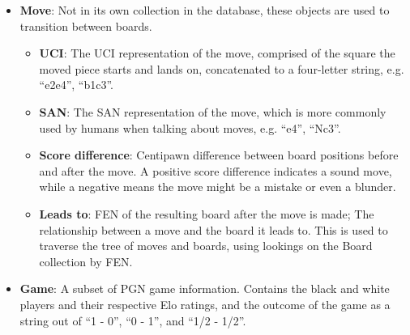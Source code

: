 \documentclass[architecture.tex]{subfiles}
\begin{document}
\begin{itemize}
\begin{itemize}
        \end{itemize}
    \item \textbf{Move}: Not in its own collection in the database, these
        objects are used to transition between boards.
        \begin{itemize}
            \item \textbf{UCI}: The UCI representation of the move, 
                comprised of the square the moved piece starts and lands on,
                concatenated to a four-letter string, e.g. ``e2e4'', ``b1c3''.
            \item \textbf{SAN}: The SAN representation of the move, which
                is more commonly used by humans when talking about moves,
                e.g. ``e4'', ``Nc3''. 
            \item \textbf{Score difference}:
                Centipawn difference between board positions before and after the move.
                A positive score difference indicates a sound move, while a negative
                means the move might be a mistake or even a blunder.
            \item \textbf{Leads to}: FEN of the resulting board after the move is made;
                The relationship between a move and the board it leads to.
                This is used to traverse the tree of moves and boards,
                using lookings on the Board collection by FEN.
        \end{itemize}
    \item \textbf{Game}: A subset of PGN game information. Contains the black
        and white players and their respective Elo ratings, and the outcome
        of the game as a string out of ``1 - 0'', ``0 - 1'', and ``1/2 - 1/2''.
\end{itemize}
\end{document}
